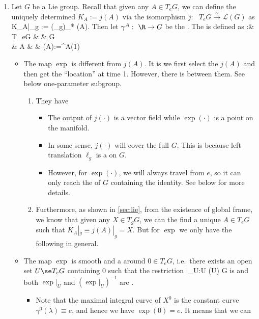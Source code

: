 \documentclass{article}
\newcommand{\cl}{:\text{ }}
\begin{document}
\begin{enumerate}
\item {}  Let $G$ be a Lie group. Recall that given any $A\in T_eG$, we can define the uniquely determined  $K_A:=j(A)$ via the isomorphism $j\cl T_eG \xrightarrow{\sim}\mathcal{L}(G)$ as
\bse
K_A|_g := (\ell_g)_* (A).
\ese
Then let $\gamma^A\cl \R \to G$ be the .  The  is defined as
\exp \cl & T_eG & \to & G\\
& A & \mapsto & \exp(A):=\gamma^A(1)
\ei
\begin{itemize}
\item {} The map $\exp$ is different from $j(A)$. It is we first select the $j(A)$ and then get the ``location'' at time 1. However, there is  between them. See below one-parameter subgroup.
\begin{enumerate}
    \item They have 
\begin{itemize}[$\ast$]
\item The output of $j(\cdot)$ is a vector field while $\exp(\cdot)$ is a point on the manifold.
    \item In some sense, $j(\cdot)$ will cover the full $G$. This  is because left  translation $\ell_g$ is a  on $G$. 
    \item However, for $\exp(\cdot)$, we will always travel from $e$, so it  can only reach the  of $G$ containing the identity. See below for more details.
\end{itemize}
 \item Furthermore, as shown in \cref{sec:lie}, from the existence of global frame, we know that given any $X\in T_gG$, we can the find a unique $A \in T_eG$ such that $K_A|_g\equiv j(A)|_g=X$. But for $\exp$ we only have the following  in general.
\end{enumerate}

    \item {} The map $\exp$ is smooth and a  around $0\in T_eG$, i.e.\ there exists an open set $U\se T_eG$ containing $0$ such that the restriction
\bse
\exp|_U\cl U \to \exp(U) \se G
\ese
is  and both $\exp|_U$ and $(\exp|_U)^{-1}$ are .
\begin{itemize}[$\ast$]
    \item Note that the maximal integral curve of $X^0$ is the constant curve $\gamma^0(\lambda)\equiv e$, and hence we have $\exp(0)=e$. It means that we can  
\end{itemize}


\end{itemize}
\end{enumerate}
\end{document}
